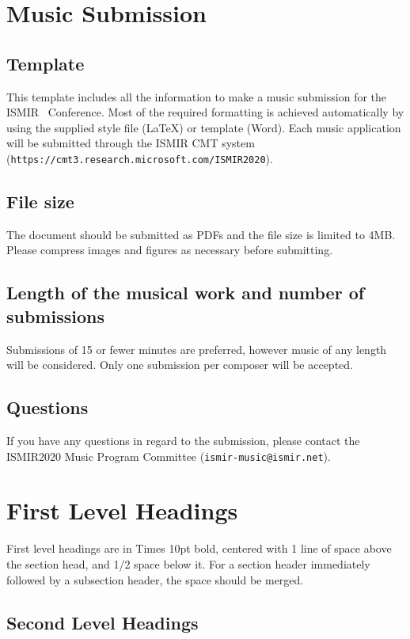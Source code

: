 \documentclass{article}
\begin{document}
\section{Music Submission}

\subsection{Template}\label{subsec:template}
This template includes all the information to make a music submission for the ISMIR \conferenceyear\ Conference.
Most of the required formatting is achieved automatically by using the supplied style file (\LaTeX) or template (Word).
Each music application will be submitted through the ISMIR CMT system (\texttt{https://cmt3.research.microsoft.com/ISMIR2020}). 

\subsection{File size}\label{subsec:size}
The document should be submitted as PDFs and the file size is limited to 4MB. Please compress images and figures as necessary before submitting.

\subsection{Length of the musical work and number of submissions}
Submissions of 15 or fewer minutes are preferred, however music of any length will be considered.
Only one submission per composer will be accepted.

\subsection{Questions}\label{subsec:questions}
If you have any questions in regard to the submission, please contact the ISMIR2020 Music Program Committee (\texttt{ismir\conferenceyear-music@ismir.net}).

\section{First Level Headings}

First level headings are in Times 10pt bold,
centered with 1 line of space above the section head, and 1/2 space below it.
For a section header immediately followed by a subsection header, the space should be merged.

\subsection{Second Level Headings}
\end{document}
